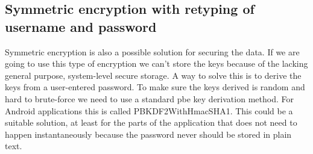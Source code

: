 \newpage

\subsection{Symmetric encryption with retyping of username and password}
Symmetric encryption is also a possible solution for securing the data. If we are going to use this type of encryption we can’t store the keys because of the lacking general purpose, system-level secure storage.
\newline
\newline
A way to solve this is to derive the keys from a user-entered password. To make sure the keys derived is random and hard to brute-force we need to use a standard \gls{pbe} key derivation method. For Android applications this is called PBKDF2WithHmacSHA1.
\newline
\newline
This could be a suitable solution, at least for the parts of the application that does not need to happen instantaneously because the password never should be stored in plain text.


